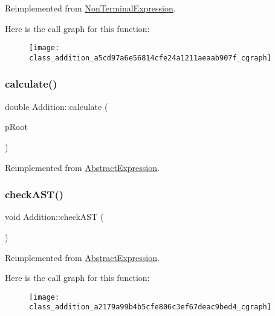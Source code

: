 Reimplemented from \mbox{\hyperlink{class_non_terminal_expression_aa65153b69523e01d86893f6d7b7fc480}{Non\+Terminal\+Expression}}.

Here is the call graph for this function\+:
\nopagebreak
\begin{figure}[H]
\begin{center}
\leavevmode
\texttt{[image: class\_addition\_a5cd97a6e56814cfe24a1211aeaab907f\_cgraph]}
\end{center}
\end{figure}
\mbox{\label{class_addition_a162afcbf8cc7ecc74af2ad2291d0abbe}} 
\subsubsection{\texorpdfstring{calculate()}{calculate()}}
{\footnotesize\ttfamily double Addition\+::calculate (\begin{DoxyParamCaption}\item[{std\+::unique\+\_\+ptr$<$ \mbox{\hyperlink{class_abstract_expression}{Abstract\+Expression}} $>$ \&}]{p\+Root }\end{DoxyParamCaption})\hspace{0.3cm}{\ttfamily [virtual]}}



Reimplemented from \mbox{\hyperlink{class_abstract_expression_a1c9871ee669668c2eb9f1f1a7d6f5d32}{Abstract\+Expression}}.

\mbox{\label{class_addition_a2179a99b4b5cfe806c3ef67deac9bed4}} 
\subsubsection{\texorpdfstring{checkAST()}{checkAST()}}
{\footnotesize\ttfamily void Addition\+::check\+A\+ST (\begin{DoxyParamCaption}{ }\end{DoxyParamCaption})\hspace{0.3cm}{\ttfamily [virtual]}}



Reimplemented from \mbox{\hyperlink{class_abstract_expression_a703563fdf65d18ce4b7f2817e2ff4581}{Abstract\+Expression}}.

Here is the call graph for this function\+:
\nopagebreak
\begin{figure}[H]
\begin{center}
\leavevmode
\texttt{[image: class\_addition\_a2179a99b4b5cfe806c3ef67deac9bed4\_cgraph]}
\end{center}
\end{figure}
\mbox{\label{class_addition_a16f231380f84d361f2de34ab7d84093a}} 

